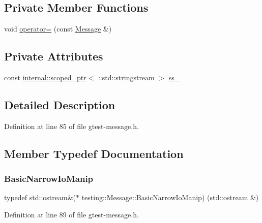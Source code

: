 \subsection*{Private Member Functions}
\begin{DoxyCompactItemize}
\item 
void \hyperlink{classtesting_1_1Message_a5a0462b539ffb88f15ea0c67977774af}{operator=} (const \hyperlink{classtesting_1_1Message}{Message} \&)
\end{DoxyCompactItemize}
\subsection*{Private Attributes}
\begin{DoxyCompactItemize}
\item 
const \hyperlink{classtesting_1_1internal_1_1scoped__ptr}{internal\+::scoped\+\_\+ptr}$<$ \+::std\+::stringstream $>$ \hyperlink{classtesting_1_1Message_ad46fbddd62cde8526744ae32e3322b76}{ss\+\_\+}
\end{DoxyCompactItemize}


\subsection{Detailed Description}


Definition at line 85 of file gtest-\/message.\+h.



\subsection{Member Typedef Documentation}
\mbox{\label{classtesting_1_1Message_ad398b70e2a11b923cef05c809b0eeb92}} 
\subsubsection{\texorpdfstring{Basic\+Narrow\+Io\+Manip}{BasicNarrowIoManip}}
{\footnotesize\ttfamily typedef std\+::ostream\&($\ast$ testing\+::\+Message\+::\+Basic\+Narrow\+Io\+Manip) (std\+::ostream \&)\hspace{0.3cm}{\ttfamily [private]}}



Definition at line 89 of file gtest-\/message.\+h.



